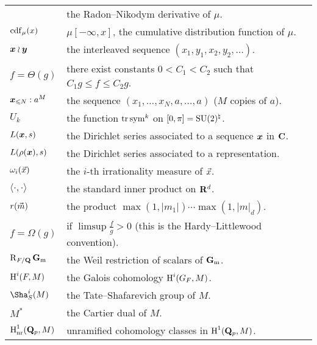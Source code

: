 \documentclass[phd,tocprelim]{cornell}
\begin{document}
\begin{tabular}{ll}
	& the Radon--Nikodym derivative of $\mu$. \\
$\operatorname{cdf}_\mu(x)$
	& $\mu[-\infty,x]$, the cumulative distribution function of $\mu$. \\	
${\boldsymbol x}\wr{\boldsymbol y}$
	& the interleaved sequence $(x_1,y_1,x_2,y_2,\dots)$. \\
$f = \Theta(g)$
	& there exist constants $0 < C_1 < C_2$ such that $C_1 g \leqslant f \leqslant C_2 g$. \\
${\boldsymbol x}_{\leqslant N} : a^M$
	& the sequence $(x_1,\dots,x_N,a,\dots,a)$ ($M$ copies of $a$). \\
$U_k$
	& the function $\operatorname{tr}\operatorname{sym}^k$ on $[0,\pi] = \operatorname{SU}(2)^\natural$. \\
$L({\boldsymbol x},s)$
	& the Dirichlet series associated to a sequence ${\boldsymbol x}$ in $\mathbf{C}$. \\
$L(\rho({\boldsymbol x}),s)$
	& the Dirichlet series associated to a representation. \\
$\omega_i(\vec{x})$
	& the $i$-th irrationality measure of $\vec{x}$. \\
$\langle \cdot,\cdot\rangle$
	& the standard inner product on $\mathbf{R}^d$. \\
$r(\vec{m})$
	& the product $\max(1,|m_1|) \cdots \max(1,|m|_d)$. \\
$f = \Omega(g)$
	& if $\limsup \frac f g > 0$ (this is the Hardy--Littlewood convention). \\
$\operatorname{R}_{F/\mathbf{Q}} \mathbf{G}_\mathrm{m}$
	& the Weil restriction of scalars of $\mathbf{G}_\mathrm{m}$. \\
$\operatorname{H}^i(F,M)$
	& the Galois cohomology $\operatorname{H}^i(G_F,M)$. \\
$\Sha^i_S(M)$
	& the Tate--Shafarevich group of $M$. \\
$M^\ast$
	& the Cartier dual of $M$. \\
$\operatorname{H}_{\mathrm{nr}}^1(\mathbf{Q}_p,M)$
	& unramified cohomology classes in $\operatorname{H}^1(\mathbf{Q}_p,M)$. 
\end{tabular}
\newpage





\normalspacing
\setcounter{page}{1}
\pagestyle{cornell}
\addtolength{\parskip}{0.5\baselineskip}

















\end{document}
